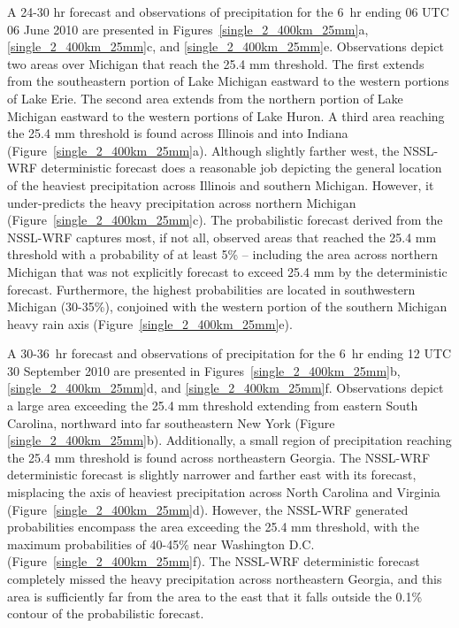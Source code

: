 A 24-30 hr forecast and observations of precipitation for the \mbox{6 hr} ending 06 UTC 06 June 2010 are presented in \mbox{Figures \ref{single_2_400km_25mm}a}, \mbox{\ref{single_2_400km_25mm}c}, and \mbox{\ref{single_2_400km_25mm}e}.
Observations depict two areas over Michigan that reach the 25.4 mm threshold.
The first extends from the southeastern portion of Lake Michigan eastward to the western portions of Lake Erie.
The second area extends from the northern portion of Lake Michigan eastward to the western portions of Lake Huron.
A third area reaching the 25.4 mm threshold is found across Illinois and into Indiana \mbox{(Figure \ref{single_2_400km_25mm}a)}.
Although slightly farther west, the NSSL-WRF deterministic forecast does a reasonable job depicting the general location of the heaviest precipitation across Illinois and southern Michigan.
However, it under-predicts the heavy precipitation across northern Michigan \mbox{(Figure \ref{single_2_400km_25mm}c)}.
The probabilistic forecast derived from the NSSL-WRF captures most, if not all, observed areas that reached the 25.4 mm threshold with a probability of at least 5\% -- including the area across northern Michigan that was not explicitly forecast to exceed 25.4 mm by the deterministic forecast.
Furthermore, the highest probabilities are located in southwestern Michigan (30-35\%), conjoined with the western portion of the southern Michigan heavy rain axis \mbox{(Figure \ref{single_2_400km_25mm}e)}.


A \mbox{30-36 hr} forecast and observations of precipitation for the \mbox{6 hr} ending 12 UTC 30 September 2010 are presented in \mbox{Figures \ref{single_2_400km_25mm}b}, \mbox{\ref{single_2_400km_25mm}d}, and \mbox{\ref{single_2_400km_25mm}f}.
Observations depict a large area exceeding the 25.4 mm threshold extending from eastern South Carolina, northward into far southeastern New York (Figure \mbox{\ref{single_2_400km_25mm}b)}.
Additionally, a small region of precipitation reaching the 25.4 mm threshold is found across northeastern Georgia.
The NSSL-WRF deterministic forecast is slightly narrower and farther east with its forecast, misplacing the axis of heaviest precipitation across North Carolina and Virginia \mbox{(Figure \ref{single_2_400km_25mm}d)}.
However, the NSSL-WRF generated probabilities encompass the area exceeding the 25.4 mm threshold, with the maximum probabilities of 40-45\% near Washington D.C. \mbox{(Figure \ref{single_2_400km_25mm}f)}.
The NSSL-WRF deterministic forecast completely missed the heavy precipitation across northeastern Georgia, and this area is sufficiently far from the area to the east that it falls outside the 0.1\% contour of the probabilistic forecast.


